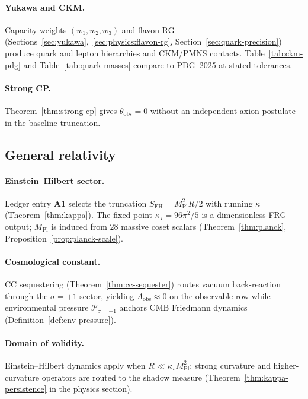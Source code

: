 \documentclass[aps,prd,onecolumn,amsmath,amssymb,nofootinbib,11pt]{revtex4-2}
\numberwithin{equation}{section}
\theoremstyle{plain}
\theoremstyle{definition}
\theoremstyle{remark}
\newcommand{\MPl}{M_{\mathrm{Pl}}}
\begin{document}
\paragraph{Yukawa and CKM.}
Capacity weights $(w_1,w_2,w_3)$ and flavon RG
(Sections~\ref{sec:yukawa},~\ref{sec:physics:flavon-rg},
Section~\ref{sec:quark-precision}) produce quark and lepton hierarchies and
CKM/PMNS contacts. Table~\ref{tab:ckm-pdg} and Table~\ref{tab:quark-masses}
compare to PDG~2025 at stated tolerances.

\paragraph{Strong CP.}
Theorem~\ref{thm:strong-cp} gives $\theta_{\mathrm{obs}}=0$ without an
independent axion postulate in the baseline truncation.

\subsection{General relativity}
\label{sec:standard-theories:gr}

\paragraph{Einstein--Hilbert sector.}
Ledger entry \textbf{A1} selects the truncation $S_{\mathrm{EH}}=\MPl^2 R/2$
with running $\kappa$ (Theorem~\ref{thm:kappa}). The fixed point
$\kappa_\star=96\pi^2/5$ is a dimensionless FRG output; $\MPl$ is induced from
$28$ massive coset scalars (Theorem~\ref{thm:planck}, Proposition~\ref{prop:planck-scale}).

\paragraph{Cosmological constant.}
CC sequestering (Theorem~\ref{thm:cc-sequester}) routes vacuum back-reaction
through the $\sigma=+1$ sector, yielding $\Lambda_{\mathrm{obs}}\approx 0$ on
the observable row while environmental pressure $\mathcal{P}_{\sigma=+1}$
anchors CMB Friedmann dynamics (Definition~\ref{def:env-pressure}).

\paragraph{Domain of validity.}
Einstein--Hilbert dynamics apply when $R\ll\kappa_\star\MPl^2$; strong
curvature and higher-curvature operators are routed to the shadow measure
(Theorem~\ref{thm:kappa-persistence} in the physics section).
\end{document}
